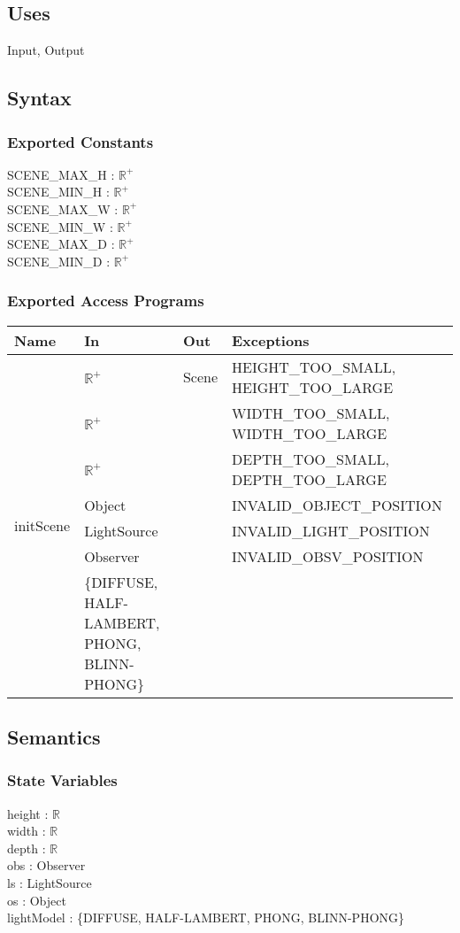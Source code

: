 \documentclass[12pt, titlepage]{article}
\begin{document}
\subsection{Uses}
Input, Output

\subsection{Syntax}
\subsubsection{Exported Constants}
SCENE\_MAX\_H : $\mathbb{R}^+$\\
SCENE\_MIN\_H : $\mathbb{R}^+$\\
SCENE\_MAX\_W : $\mathbb{R}^+$\\
SCENE\_MIN\_W : $\mathbb{R}^+$\\
SCENE\_MAX\_D : $\mathbb{R}^+$\\
SCENE\_MIN\_D : $\mathbb{R}^+$\\
\subsubsection{Exported Access Programs}
\begin{center}
	\begin{tabular}{p{2cm} p{4cm} p{2cm} p{4cm}}
		\hline
		\textbf{Name} & \textbf{In} & \textbf{Out} & \textbf{Exceptions} \\
		\hline
		\multirow{7}{4cm}{initScene} & $\mathbb{R}^+$ & Scene & 
		HEIGHT\_TOO\_SMALL, 
		HEIGHT\_TOO\_LARGE\\
		& $\mathbb{R}^+$ & & WIDTH\_TOO\_SMALL, 
		WIDTH\_TOO\_LARGE\\		
		& $\mathbb{R}^+$ & & DEPTH\_TOO\_SMALL, 
		DEPTH\_TOO\_LARGE\\				 
		& Object & & INVALID\_OBJECT\_POSITION\\				 
		& LightSource & & INVALID\_LIGHT\_POSITION\\
		& Observer & & INVALID\_OBSV\_POSITION\\
		& \{DIFFUSE, HALF-LAMBERT, PHONG, BLINN-PHONG\} & & \\
		\hline
	\end{tabular}
\end{center}

\subsection{Semantics}
\subsubsection{State Variables}
height : $\mathbb{R}$\\
width : $\mathbb{R}$\\
depth : $\mathbb{R}$\\
obs : Observer \\
ls : LightSource \\
os : Object\\
lightModel : \{DIFFUSE, HALF-LAMBERT, PHONG, BLINN-PHONG\}
\end{document}
